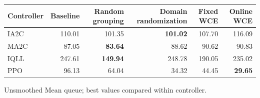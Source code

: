 \begin{tabular}{lrrrrr}
\hline
Controller & Baseline & Random grouping & Domain randomization & Fixed WCE & Online WCE \\
\hline
IA2C & 110.01 & 101.35 & \textbf{101.02} & 107.70 & 116.09 \\
MA2C & 87.05 & \textbf{83.64} & 88.62 & 90.62 & 90.83 \\
IQLL & 247.61 & \textbf{149.94} & 248.78 & 190.05 & 235.02 \\
PPO & 96.13 & 64.04 & 34.32 & 44.45 & \textbf{29.65} \\
\hline
\end{tabular}
Unsmoothed Mean queue; best values compared within controller.
